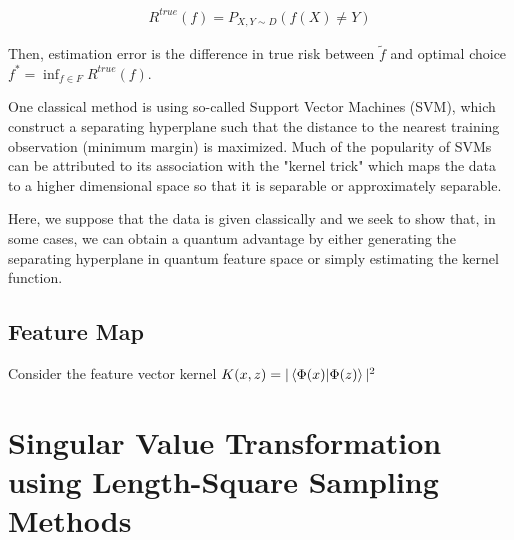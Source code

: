 \documentclass[11pt]{article}
\newcommand\0{\mathbf{0}}
\newcommand\<{\langle}
\renewcommand\>{\rangle}
\begin{document}
\begin{align*}
R^{true}(f) = P_{X, Y \sim D}(f(X) \neq Y)	
\end{align*}

Then, estimation error is the difference in true risk between $\tilde{f}$ and optimal choice $f^* = \inf_{f \in F}R^{true}(f)$.

One classical method is using so-called Support Vector Machines (SVM), which construct a separating hyperplane such that the distance to the nearest training observation (minimum margin) is maximized. Much of the popularity of SVMs can be attributed to its association with the "kernel trick" which maps the data to a higher dimensional space so that it is separable or approximately separable.

Here, we suppose that the data is given classically and we seek to show that, in some cases, we can obtain a quantum advantage by either generating the separating hyperplane in quantum feature space or simply estimating the kernel function.

\subsection{Feature Map}

Consider the feature vector kernel $K(x, z) = | \bra{\Phi(x)}\ket{\Phi(z)} |^2$

%
%

\section{Singular Value Transformation using Length-Square Sampling Methods}
\end{document}
